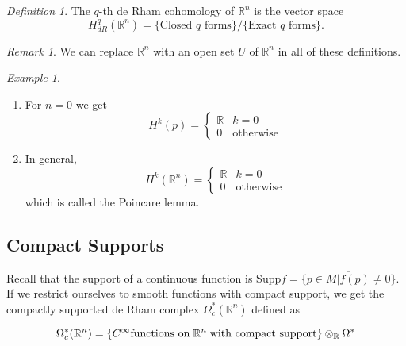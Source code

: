 \documentclass[12pt]{amsart}
\newcommand{\R}{\mathbb{R}} %
\theoremstyle{remark}
\newtheorem{definition}{Definition}
\newtheorem{remark}{Remark}
\newtheorem{example}{Example}
\begin{document}
\begin{definition}
    The $q$-th de Rham cohomology of $\R^n$ is the vector space 
    \begin{equation*}
        H^q_{dR}(\R^n) = \{\text{Closed }q\text{ forms}\}/\{\text{Exact } q\text{ forms}\}.
    \end{equation*}
\end{definition}

\begin{remark}
    We can replace $\R^n$ with an open set $U$ of $\R^n$ in all of these definitions. 
\end{remark}

\begin{example}
    \begin{enumerate}
        \item For $n=0$ we get 
        \begin{equation*}
            H^k(p) = \begin{cases} 
      \mathbb{R} & k=0 \\
    0 & \text{otherwise}
   \end{cases}
        \end{equation*}
        \item In general,
        \begin{equation*}
            H^k(\R^n) = 
            \begin{cases} 
            \mathbb{R} & k=0 \\
            0 & \text{otherwise}
            \end{cases}
        \end{equation*}
        which is called the Poincare lemma.
    \end{enumerate}
\end{example}

\subsection{Compact Supports}

Recall that the support of a continuous function is $\text{Supp}f=\overline{\{p\in M | f(p)\neq0\}}.$ If we restrict ourselves to smooth functions with compact support, we get the compactly supported de Rham complex $\Omega_c^*(\mathbb{R}^n)$ defined as

\begin{equation*}
    \Omega_c^*(\mathbb{R}^n)= \{C^\infty \text{functions on\;} \mathbb{R}^n\; \text{with compact support}\}\otimes_\mathbb{R} \Omega^*
\end{equation*}
\end{document}
